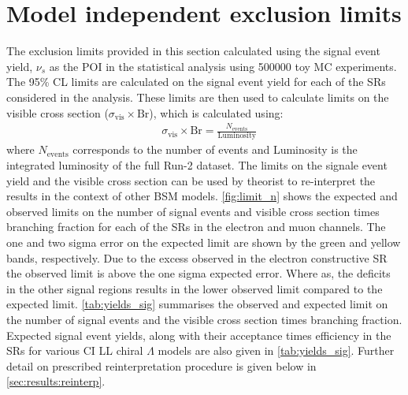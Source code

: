 \section{Model independent exclusion limits}
The exclusion limits provided in this section calculated using the signal event yield, $\nu_s$ as the POI in the statistical analysis using 500000 toy MC experiments. The 95\% CL limits are calculated on the signal event yield for each of the SRs considered in the analysis. These limits are then used to calculate limits on the visible cross section ($\sigma_\textrm{vis}\times\textrm{Br}$), which is calculated using:
\begin{equation}
    \label{eq:visxs}
    \begin{aligned}
        & \sigma_\textrm{vis}\times\textrm{Br} = \frac{N_{\mathrm{events}}}{\mathrm{Luminosity}}
    \end{aligned}
\end{equation}
where $N_{\mathrm{events}}$ corresponds to the number of events and Luminosity is the integrated luminosity of the full Run-2 dataset. The limits on the signale event yield and the visible cross section can be used by theorist to re-interpret the results in the context of other BSM models. \cref{fig:limit_n} shows the expected and observed limits on the number of signal events and visible cross section times branching fraction for each of the SRs in the electron and muon channels. The one and two sigma error on the expected limit are shown by the green and yellow bands, respectively. Due to the excess observed in the electron constructive SR the observed limit is above the one sigma expected error. Where as, the deficits in the other signal regions results in the lower observed limit compared to the expected limit. \cref{tab:yields_sig} summarises the observed and expected limit on the number of signal events and the visible cross section times branching fraction. Expected signal event yields, along with their acceptance times efficiency in the SRs for various CI LL chiral $\Lambda$ models are also given in \cref{tab:yields_sig}. Further detail on prescribed reinterpretation procedure is given below in \cref{sec:results:reinterp}.

